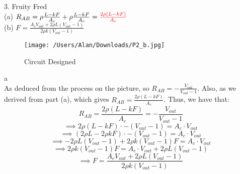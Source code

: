 \documentclass{article}
\begin{document}
{\LARGE 3. Fruity Fred} \\[.5cm]
{\Large (a) $R_{AB} = \rho\frac{L-kF}{A_c} + \rho\frac{L-kF}{A_c} = {\color{red} \frac{2\rho (L-kF)}{A_c}}$} \\[1cm]
{\Large (b) {\color{red} $F = \frac{A_cV_{out} + 2\rho L(V_{out}-1)}{2\rho k(V_{out}-1)}$}}

\begin{figure} [h!]
\begin{center}
	\texttt{[image: /Users/Alan/Downloads/P2\_b.jpg]}
	\caption{Circuit Designed}
	\label{fig}
\end{center}
\end{figure}
{\color{white} a} \\

As deduced from the process on the picture,
so $R_{AB} = -\frac{V_{out}}{V_{out}-1}$. Also, as we derived from part (a), which gives $R_{AB} = \frac{2\rho (L-kF)}{A_c}$. Thus, we have that:
$$R_{AB} = \frac{2\rho (L-kF)}{A_c} = -\frac{V_{out}}{V_{out}-1}$$
$$\implies 2\rho (L-kF)\cdot-(V_{out}-1) = A_c\cdot V_{out}$$
$$\implies (2\rho L-2\rho kF)\cdot-(V_{out}-1) = A_c\cdot V_{out}$$
$$\implies -2\rho L(V_{out}-1) + 2\rho k(V_{out}-1)F = A_c\cdot V_{out}$$
$$\implies 2\rho k(V_{out}-1)F = A_c\cdot V_{out} + 2\rho L(V_{out}-1)$$
$$\implies F = \frac{A_cV_{out} + 2\rho L(V_{out}-1)}{2\rho k(V_{out}-1)}$$
\end{document}
